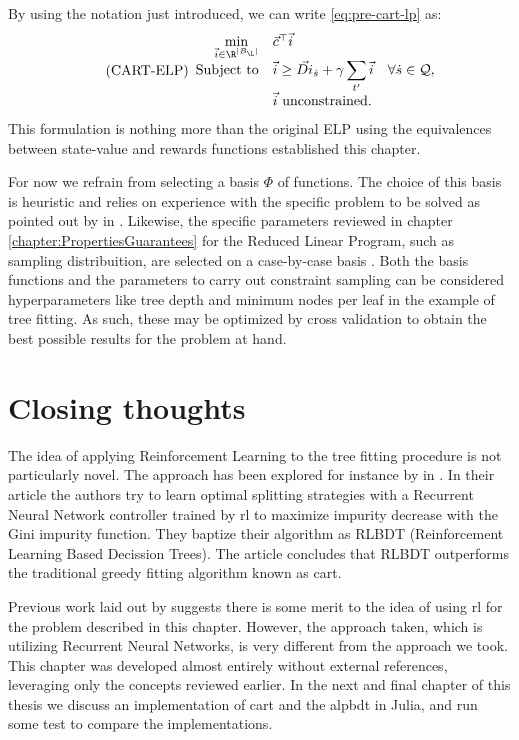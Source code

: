 By using the notation just introduced, we can write \eqref{eq:pre-cart-lp} as:
\begin{equation}
\tag{CART-ELP}
\label{lp:cart-elp}
\begin{array}{rl@{}ll}
    \displaystyle \min_{\vec{i} \in \R^{|B_\L|}} & \vec{c}^{\top} \vec{i} \\
    \text{Subject to} & \displaystyle \vec{i} \geq \vec{Di}_{\dot{s}} + \gamma \sum_{t'} \vec{i} & \quad \forall \dot{s} \in \mathcal{Q}, \\
    & \vec{i} \text{ unconstrained.} &
\end{array}
\end{equation}
This formulation is nothing more than the original ELP using the equivalences between state-value and rewards functions established this chapter.

For now we refrain from selecting a basis $\Phi$ of functions. The choice of
this basis is heuristic and relies on experience with the specific problem to be
solved as pointed out by \citeauthor{farias2003LP2ADP} in
\cite{farias2003LP2ADP}. Likewise, the specific parameters reviewed in chapter
\ref{chapter:PropertiesGuarantees} for the Reduced Linear Program, such as
sampling distribuition, are selected on a case-by-case basis
\cite{farias2004constraint}. Both the basis functions and the parameters to
carry out constraint sampling can be considered hyperparameters like tree depth
and minimum nodes per leaf in the example of tree fitting. As such, these may be
optimized by cross validation \cite[Ch.~2.1]{intro2statslearning} to obtain the
best possible results for the problem at hand.  

\section{Closing thoughts}

The idea of applying Reinforcement Learning to the tree fitting procedure is not
particularly novel. The approach has been explored for instance by
\citeauthor{xiong} in \cite{xiong}. In their article the authors try to learn
optimal splitting strategies with a Recurrent Neural Network controller trained
by \ac{rl} to maximize impurity decrease with the Gini impurity function. They
baptize their algorithm as RLBDT (Reinforcement Learning Based Decission Trees).
The article concludes that RLBDT outperforms the traditional greedy fitting
algorithm known as \ac{cart}.

Previous work laid out by \citeauthor{xiong} suggests there is some merit to the
idea of using \ac{rl} for the problem described in this chapter. However, the
approach taken, which is utilizing Recurrent Neural Networks, is very different
from the approach we took. This chapter was developed almost entirely without
external references, leveraging only the concepts reviewed earlier. In the next
and final chapter of this thesis we discuss an implementation of \ac{cart} and
the \ac{alpbdt} in Julia, and run some test to compare the implementations.